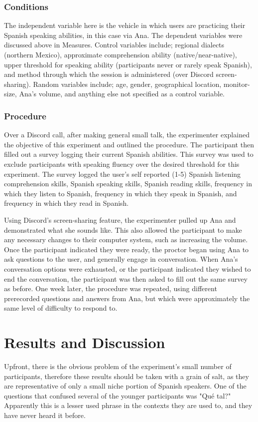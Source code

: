 \documentclass{vgtc}                          %
\begin{document}
\subsubsection{Conditions}
The independent variable here is the vehicle in which users are practicing their Spanish speaking abilities, in this case via Ana.
The dependent variables were discussed above in Measures.
Control variables include; regional dialects (northern Mexico), approximate comprehension ability (native/near-native), upper threshold for speaking ability (participants never or rarely speak Spanish), and method through which the session is administered (over Discord screen-sharing).
Random variables include; age, gender, geographical location, monitor-size, Ana's volume, and anything else not specified as a control variable.

\subsubsection{Procedure}
Over a Discord call, after making general small talk, the experimenter explained the objective of this experiment and outlined the procedure.
The participant then filled out a survey logging their current Spanish abilities.
This survey was used to exclude participants with speaking fluency over the desired threshold for this experiment.
The survey logged the user's self reported (1-5) Spanish listening comprehension skills, Spanish speaking skills, Spanish reading skills, frequency in which they listen to Spanish, frequency in which they speak in Spanish, and frequency in which they read in Spanish. 

Using Discord's screen-sharing feature, the experimenter pulled up Ana and demonstrated what she sounds like.
This also allowed the participant to make any necessary changes to their computer system, such as increasing the volume.
Once the participant indicated they were ready, the proctor began using Ana to ask questions to the user, and generally engage in conversation.
When Ana's conversation options were exhausted, or the participant indicated they wished to end the conversation, the participant was then asked to fill out the same survey as before.
One week later, the procedure was repeated, using different prerecorded questions and answers from Ana, but which were approximately the same level of difficulty to respond to.



\section{Results and Discussion}
Upfront, there is the obvious problem of the experiment's small number of participants, therefore these results should be taken with a grain of salt, as they are representative of only a small niche portion of Spanish speakers.
One of the questions that confused several of the  younger participants was "Qué tal?"
Apparently this is a lesser used phrase in the contexts they are used to, and they have never heard it before.
\end{document}

